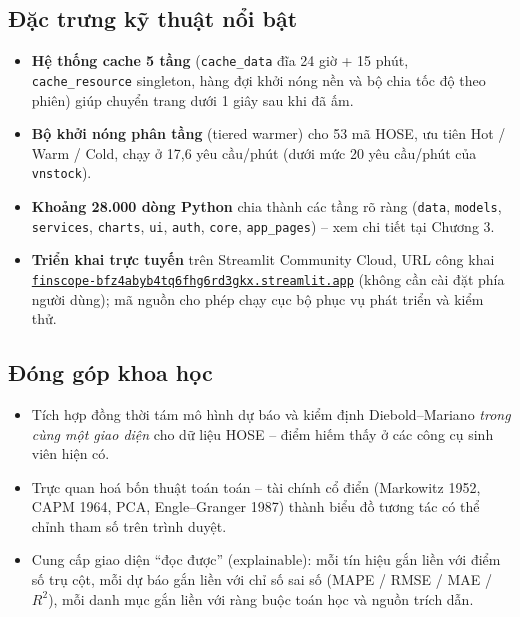 \documentclass[12pt,a4paper,openany,oneside]{report}
\numberwithin{equation}{chapter}
\begin{document}
\subsection{Đặc trưng kỹ thuật nổi bật}

\begin{itemize}[leftmargin=22pt,topsep=2pt,itemsep=3pt]
  \item \textbf{Hệ thống cache 5 tầng} (\texttt{cache\_data} đĩa 24
        giờ + 15 phút, \texttt{cache\_resource} singleton, hàng đợi
        khởi nóng nền và bộ chia tốc độ theo phiên) giúp chuyển trang
        dưới 1 giây sau khi đã ấm.
  \item \textbf{Bộ khởi nóng phân tầng} (tiered warmer) cho 53 mã
        HOSE, ưu tiên Hot / Warm / Cold, chạy ở 17,6 yêu cầu/phút
        (dưới mức 20 yêu cầu/phút của \texttt{vnstock}).
  \item \textbf{Khoảng 28.000 dòng Python} chia thành các tầng rõ
        ràng (\texttt{data}, \texttt{models}, \texttt{services},
        \texttt{charts}, \texttt{ui}, \texttt{auth}, \texttt{core},
        \texttt{app\_pages}) -- xem chi tiết tại Chương 3.
  \item \textbf{Triển khai trực tuyến} trên Streamlit Community Cloud,
        URL công khai
        \href{https://finscope-bfz4abyb4tq6fhg6rd3gkx.streamlit.app}{\texttt{finscope-bfz4abyb4tq6fhg6rd3gkx.streamlit.app}}
        (không cần cài đặt phía người dùng); mã nguồn cho phép chạy
        cục bộ phục vụ phát triển và kiểm thử.
\end{itemize}

\subsection{Đóng góp khoa học}

\begin{itemize}[leftmargin=22pt,topsep=2pt,itemsep=3pt]
  \item Tích hợp đồng thời tám mô hình dự báo và kiểm định
        Diebold--Mariano \emph{trong cùng một giao diện} cho dữ liệu
        HOSE -- điểm hiếm thấy ở các công cụ sinh viên hiện có.
  \item Trực quan hoá bốn thuật toán toán -- tài chính cổ điển
        (Markowitz 1952, CAPM 1964, PCA, Engle--Granger 1987) thành
        biểu đồ tương tác có thể chỉnh tham số trên trình duyệt.
  \item Cung cấp giao diện ``đọc được'' (explainable): mỗi tín hiệu
        gắn liền với điểm số trụ cột, mỗi dự báo gắn liền với chỉ số
        sai số (MAPE / RMSE / MAE / $R^2$), mỗi danh mục gắn liền với
        ràng buộc toán học và nguồn trích dẫn.
\end{itemize}
\end{document}
